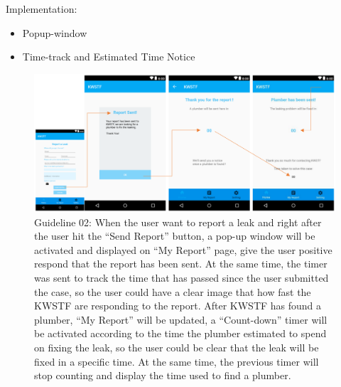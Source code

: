 \documentclass{article}
\begin{document}
\noindent
Implementation:
\begin{itemize}
\item Popup-window
\item Time-track and Estimated Time Notice
\end{itemize}
\begin{figure}[H]
\centering
\includegraphics[width=15cm]{files/figures/fig1_guide2.png}
\caption{Guideline 02: When the user want to report a leak and right after the user hit the “Send Report” button, a pop-up window will be
activated and displayed on “My Report” page, give the user positive respond that the report has been sent. At the same
time, the timer was sent to track the time that has passed since the user submitted the case, so the user could have a clear
image that how fast the KWSTF are responding to the report.
After KWSTF has found a plumber, “My Report” will be updated, a “Count-down” timer will be activated according to the
time the plumber estimated to spend on fixing the leak, so the user could be clear that the leak will be fixed in a specific
time. At the same time, the previous timer will stop counting and display the time used to find a plumber.}
\end{figure}
\end{document}
